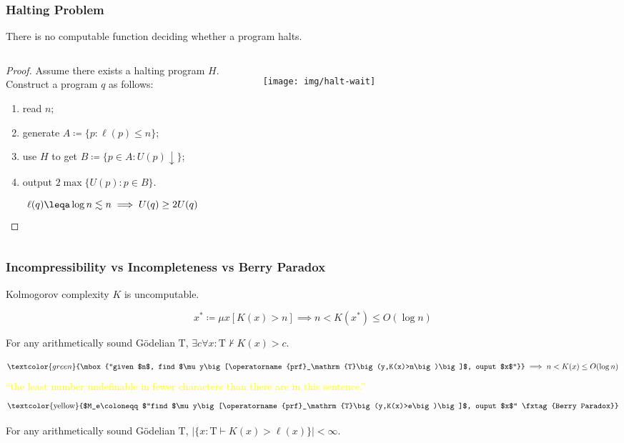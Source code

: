 \documentclass[UTF8,11pt,colorlinks,compress,openany]{beamer}%
\begin{document}
\begin{frame}\frametitle{Halting Problem}
	\setlength\abovedisplayskip{0pt}
	\setlength\belowdisplayskip{0pt}
	\begin{theorem}
		There is no computable function deciding whether a program halts.
	\end{theorem}
\begin{columns}
\begin{proof}
	Assume there exists a halting program $H$.\\
	Construct a program $q$ as follows: 
	\begin{enumerate}
		\item read $n$;
		\item generate $A\coloneqq \{p:\ell(p)\leq n\}$;
		\item use $H$ to get $B\coloneqq \{p\in A: U(p)\downarrow\}$;
		\item output $2\max\{U(p): p\in B\}$.
	\end{enumerate}
\[\ell(q)\leqa\log n\lesssim n\implies U(q)\geq 2U(q)\]
\end{proof}
\begin{figure}[H]
	\texttt{[image: img/halt-wait]}
\end{figure}
\end{columns}
\end{frame}

\begin{frame}\frametitle{Incompressibility vs Incompleteness vs Berry Paradox}
	\begin{theorem}[Kolmogorov]
		Kolmogorov complexity $K$ is uncomputable.
	\end{theorem}\vspace{-11pt}
	\[x^*\coloneqq \mu x[K(x)>n]\implies n<K(x^*)\leq O(\log n)\]
	\begin{theorem}[Chaitin]
		For any arithmetically sound G\"odelian $\mathrm{T}$, $\exists c\forall x: \mathrm{T}\nvdash K(x)>c$.
	\end{theorem}\vspace{-17pt}
	\[\textcolor{green}{\mbox{``given $n$, find $\mu y\big[\operatorname{prf}_\mathrm{T}\big(y,K(x)>n\big)\big]$, ouput $x$''}}\implies n<K(x)\leq O(\log n)\]
	{\centering\small \textcolor{yellow}{``the least number undefinable in fewer characters than there are in this sentence.''}}
	\[\mbox{\textcolor{yellow}{$M_e\coloneqq $``find $\mu y\big[\operatorname{prf}_\mathrm{T}\big(y,K(x)>e\big)\big]$, ouput $x$'' \tag{Berry Paradox}}}\]
	\begin{theorem}[Chaitin]
		For any arithmetically sound G\"odelian $\mathrm{T}$, $\big|\big\{x: \mathrm{T}\vdash K(x)>\ell(x)\big\}\big|<\infty$.
	\end{theorem}
\end{frame}
\end{document}
